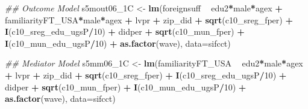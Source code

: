 \documentclass[
]{article}
\newenvironment{Shaded}{\begin{snugshade}}{\end{snugshade}}
\newcommand{\CommentTok}[1]{\textcolor[rgb]{0.56,0.35,0.01}{\textit{#1}}}
\newcommand{\DataTypeTok}[1]{\textcolor[rgb]{0.13,0.29,0.53}{#1}}
\newcommand{\DecValTok}[1]{\textcolor[rgb]{0.00,0.00,0.81}{#1}}
\newcommand{\KeywordTok}[1]{\textcolor[rgb]{0.13,0.29,0.53}{\textbf{#1}}}
\newcommand{\NormalTok}[1]{#1}
\newcommand{\OperatorTok}[1]{\textcolor[rgb]{0.81,0.36,0.00}{\textbf{#1}}}
\newcommand{\StringTok}[1]{\textcolor[rgb]{0.31,0.60,0.02}{#1}}
\begin{document}
\begin{Shaded}
\begin{Highlighting}[]
\CommentTok{## Outcome Model }
\NormalTok{s5mout06_1C <-}\StringTok{ }\KeywordTok{lm}\NormalTok{(foreignsuff  }\OperatorTok{~}\StringTok{ }\NormalTok{edu2}\OperatorTok{*}\NormalTok{male}\OperatorTok{*}\NormalTok{agex }\OperatorTok{+}\StringTok{ }\NormalTok{familiarityFT_USA}\OperatorTok{*}\NormalTok{male}\OperatorTok{*}\NormalTok{agex }\OperatorTok{+}\StringTok{ }\NormalTok{lvpr }\OperatorTok{+}\StringTok{  }
\StringTok{                    }\NormalTok{zip_did }\OperatorTok{+}\StringTok{ }\KeywordTok{sqrt}\NormalTok{(c10_sreg_fper) }\OperatorTok{+}\StringTok{ }\KeywordTok{I}\NormalTok{(c10_sreg_edu_ugsP}\OperatorTok{/}\DecValTok{10}\NormalTok{) }\OperatorTok{+}\StringTok{ }
\StringTok{                    }\NormalTok{didper }\OperatorTok{+}\StringTok{ }\KeywordTok{sqrt}\NormalTok{(c10_mun_fper) }\OperatorTok{+}\StringTok{ }\KeywordTok{I}\NormalTok{(c10_mun_edu_ugsP}\OperatorTok{/}\DecValTok{10}\NormalTok{) }\OperatorTok{+}\StringTok{ }
\StringTok{                    }\KeywordTok{as.factor}\NormalTok{(wave), }\DataTypeTok{data=}\NormalTok{sifcct)}

\CommentTok{## Mediator Model}
\NormalTok{s5mm06_1C <-}\StringTok{ }\KeywordTok{lm}\NormalTok{(familiarityFT_USA  }\OperatorTok{~}\StringTok{ }\NormalTok{edu2}\OperatorTok{*}\NormalTok{male}\OperatorTok{*}\NormalTok{agex }\OperatorTok{+}\StringTok{ }\NormalTok{lvpr }\OperatorTok{+}\StringTok{  }
\StringTok{                  }\NormalTok{zip_did }\OperatorTok{+}\StringTok{ }\KeywordTok{sqrt}\NormalTok{(c10_sreg_fper) }\OperatorTok{+}\StringTok{ }\KeywordTok{I}\NormalTok{(c10_sreg_edu_ugsP}\OperatorTok{/}\DecValTok{10}\NormalTok{) }\OperatorTok{+}\StringTok{ }
\StringTok{                  }\NormalTok{didper }\OperatorTok{+}\StringTok{ }\KeywordTok{sqrt}\NormalTok{(c10_mun_fper) }\OperatorTok{+}\StringTok{ }\KeywordTok{I}\NormalTok{(c10_mun_edu_ugsP}\OperatorTok{/}\DecValTok{10}\NormalTok{) }\OperatorTok{+}\StringTok{ }
\StringTok{                  }\KeywordTok{as.factor}\NormalTok{(wave), }\DataTypeTok{data=}\NormalTok{sifcct)}


\end{Highlighting}
\end{Shaded}
\end{document}
